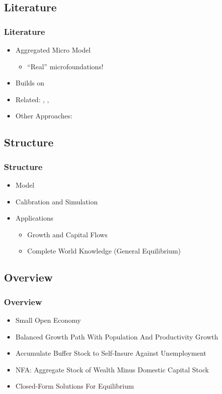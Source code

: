 \documentclass{beamer}
\begin{document}
\subsection{Literature}
\begin{frame}
\frametitle{Literature}
    \begin{itemize}
    \item Aggregated Micro Model
\begin{itemize}
\item ``Real'' microfoundations!
\end{itemize}
    \item Builds on \cite{toche:urisk}
    \item Related: \cite{fogliPerriMod}, \cite{mqrImbal}, \cite{sandriGrowth}
    \item Other Approaches: \cite{cfg:globimbalances}
    \end{itemize}

\end{frame}

\subsection{Structure}
\begin{frame}
\frametitle{Structure}
    \begin{itemize}
    \item Model
    \item Calibration and Simulation
    \item Applications
\begin{itemize}
    \item Growth and Capital Flows
    \item Complete World Knowledge (General Equilibrium)
\end{itemize}
    \end{itemize}
\end{frame}

\subsection{Overview}
\begin{frame}
\frametitle{Overview}
    \begin{itemize}
    \item Small Open Economy
    \item Balanced Growth Path With Population And Productivity Growth
    \item Accumulate Buffer Stock to Self-Insure Against Unemployment 
    \item NFA: Aggregate Stock of Wealth Minus Domestic Capital Stock
    \item Closed-Form Solutions For Equilibrium
    \end{itemize}

\end{frame}
\end{document}
